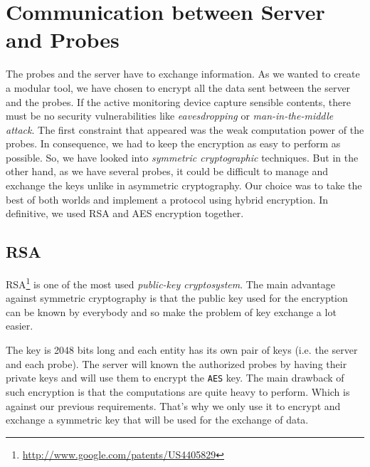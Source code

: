 \section{Communication between Server and Probes}
The probes and the server have to exchange information. As we wanted to create a modular tool, we have chosen to encrypt all the data sent between the server and the probes. If the active monitoring device capture sensible contents, there must be no security vulnerabilities like \emph{eavesdropping} or \emph{man-in-the-middle attack}.
The first constraint that appeared was the weak computation power of the probes. In consequence, we had to keep the encryption as easy to perform as possible. So, we have looked into \emph{symmetric cryptographic} techniques. But in the other hand, as we have several probes, it could be difficult to manage and exchange the keys unlike in asymmetric cryptography. Our choice was to take the best of both worlds and implement a protocol using hybrid encryption.
In definitive, we used RSA and AES encryption together.

\subsection{RSA}
RSA\footnote{\url{http://www.google.com/patents/US4405829}} is one of the most used \emph{public-key cryptosystem}. The main advantage against symmetric cryptography is that the public key used for the encryption can be known by everybody and so make the problem of key exchange a lot easier.

The key is 2048 bits long and each entity has its own pair of keys (i.e. the server and each probe). The server will known the authorized probes by having their private keys and will use them to encrypt the \texttt{AES} key.
The main drawback of such encryption is that the computations are quite heavy to perform. Which is against our previous requirements. That's why we only use it to encrypt and exchange a symmetric key that will be used for the exchange of data.

